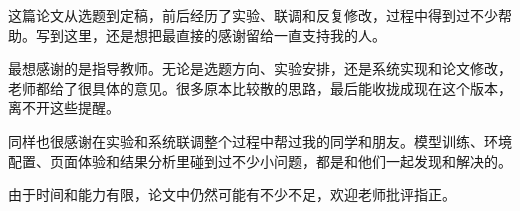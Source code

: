 \begin{acknowledge}
    这篇论文从选题到定稿，前后经历了实验、联调和反复修改，过程中得到过不少帮助。写到这里，还是想把最直接的感谢留给一直支持我的人。

    最想感谢的是指导教师。无论是选题方向、实验安排，还是系统实现和论文修改，老师都给了很具体的意见。很多原本比较散的思路，最后能收拢成现在这个版本，离不开这些提醒。

    同样也很感谢在实验和系统联调整个过程中帮过我的同学和朋友。模型训练、环境配置、页面体验和结果分析里碰到过不少小问题，都是和他们一起发现和解决的。

    由于时间和能力有限，论文中仍然可能有不少不足，欢迎老师批评指正。
\end{acknowledge}

